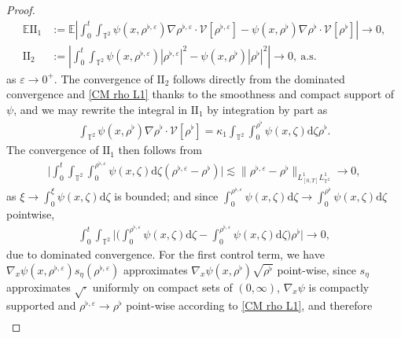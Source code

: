 \begin{proof}
\begin{align*}
\mathbb{E}\mathrm{II}_{1} & := \mathbb{E}\left|\int_{0}^{t} \int_{\mathbb{T}^2} \psi (x, \rho^{\flat,\varepsilon}) \nabla \rho^{\flat,\varepsilon} \cdot \mathcal{V}[\rho^{\flat,\varepsilon}] - \psi (x, \rho^{\flat}) \nabla \rho^{\flat} \cdot \mathcal{V}[\rho^{\flat}]\right| \to 0,\\
\mathrm{II}_{2} & := \left|\int_{0}^{t} \int_{\mathbb{T}^2} \psi (x, \rho^{\flat,\varepsilon}) |\rho^{\flat,\varepsilon}|^2 - \psi (x, \rho^{\flat}) |\rho^{\flat}|^2\right| \to 0, \ \text{a.s.}
\end{align*}
as $\varepsilon \to 0^+$. The convergence of $\mathrm{II}_{2}$ follows directly from the dominated convergence and \eqref{CM rho L1} thanks to the smoothness and compact support of $\psi$, and we may rewrite the integral in $\mathrm{II}_{1}$ by integration by part as 
\begin{align*}
\int_{\mathbb{T}^2} \psi (x, \rho^{\flat}) \nabla \rho^{\flat} \cdot \mathcal{V}[\rho^{\flat}] = \kappa_1\int_{\mathbb{T}^2} \int_0^{\rho^{\flat}}\psi (x,\zeta)\mathrm{d}\zeta \rho^{\flat}.
\end{align*}
The convergence of $\mathrm{II}_{1}$ then follows from 
\begin{align*}
\Big|\int_0^t\int_{\mathbb{T}^2}  \int_0^{\rho^{\flat,\varepsilon}}\psi (x,\zeta)\mathrm{d}\zeta (\rho^{\flat,\varepsilon} - \rho^{\flat} )\Big| \lesssim \| \rho^{\flat,\varepsilon} - \rho^{\flat} \|_{L^1_{[0,T]}L^1_{\mathbb{T}^2}} \to 0, 
\end{align*}
as $\xi \to  \int_0^{\xi}\psi (x,\zeta)\mathrm{d}\zeta$ is bounded; and since $\int_0^{\rho^{\flat,\varepsilon}}\psi (x,\zeta)\mathrm{d}\zeta \to \int_0^{\rho^{\flat}}\psi (x,\zeta)\mathrm{d}\zeta$ pointwise,
\begin{align*}
\int_0^t\int_{\mathbb{T}^2} \Big| \Big(\int_0^{\rho^{\flat,\varepsilon}}\psi (x,\zeta)\mathrm{d}\zeta - \int_0^{\rho^{\flat,\varepsilon}}\psi (x,\zeta)\mathrm{d}\zeta \Big) \rho^{\flat} \Big| \to 0,
\end{align*}
due to dominated convergence. For the first control term, we have $\nabla_x\psi(x, \rho^{\flat,\varepsilon}) s_{\eta}(\rho^{\flat,\varepsilon})$ approximates $\nabla_x\psi(x, \rho^{\flat}) \sqrt{\rho^{\flat}}$ point-wise, since $s_{\eta}$ approximates $\sqrt{\cdot}$ uniformly on compact sets of $(0,\infty)$, $\nabla_x\psi$ is compactly supported and $\rho^{\flat,\varepsilon} \to \rho^{\flat}$ point-wise according to \eqref{CM rho L1}, and therefore
\begin{align}\label{eq:conv-grho-11}

\end{align}
\end{proof}
